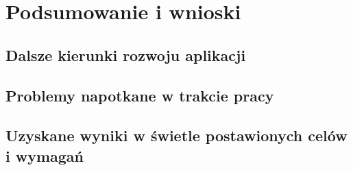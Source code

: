 \documentclass[a4paper,twoside,12pt]{book}
\begin{document}





\chapter{Podsumowanie i wnioski}
\label{ch:Podsumowanie}

\section{Dalsze kierunki rozwoju aplikacji}

\section{Problemy napotkane w trakcie pracy}

\section{Uzyskane wyniki w świetle postawionych celów i wymagań}







\backmatter

\printbibliography           %
\end{document}

